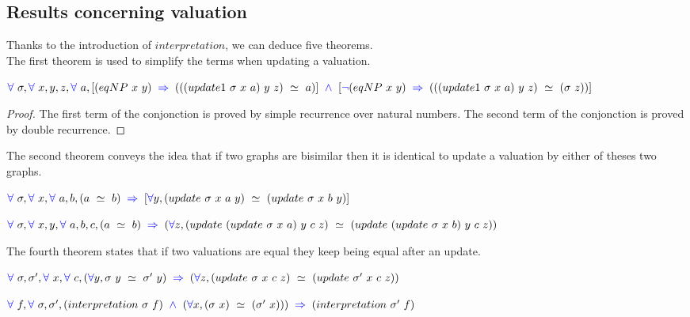 \documentclass[a4paper]{article}
\begin{document}
\subsection{Results concerning valuation}

Thanks to the introduction of $interpretation$, we can deduce five theorems. \\

The first theorem is used to simplify the terms when updating a valuation.

\begin{theorem}
$\fa \ \sigma, \fa \ x, y, z, \fa \ a, [(eqNP \ x \ y) \ \imp \ (((update1 \ \sigma \ x \ a) \ y \ z) \ \simeq \ a)] \ \conj \ [\blneg(eqNP \ x \ y) \ \imp \ (((update1 \ \sigma \ x \ a) \ y \ z) \ \simeq \ (\sigma \ z))]$
\end{theorem}

\begin{proof}
The first term of the conjonction is proved by simple recurrence over natural numbers. The second term of the conjonction is proved by double recurrence.
\end{proof}

The second theorem conveys the idea that if two graphs are bisimilar then it is identical to update a valuation by either of theses two graphs.

\begin{theorem}
$\fa \ \sigma, \fa \ x, \fa \ a, b, (a \ \simeq \ b) \ \imp \ [\fa y, (update \ \sigma \ x \ a \ y) \ \simeq \ (update \ \sigma \ x \ b \ y)]$
\end{theorem}

\begin{theorem}
$\fa \ \sigma, \fa \ x, y, \fa \ a, b, c, (a \ \simeq \ b) \ \imp \ (\fa z, (update \ (update \ \sigma \ x \ a) \ y \ c \ z) \ \simeq \ (update \  (update \ \sigma \ x \ b) \ y \ c \ z))$
\end{theorem}

The fourth theorem states that if two valuations are equal they keep being equal after an update.

\begin{theorem}
$\fa \ \sigma, \sigma', \fa \ x, \fa \ c, (\fa y, \sigma \ y \ \simeq \ \sigma' \ y) \ \imp \ (\fa z, (update \ \sigma \ x \ c \ z) \ \simeq \ (update \ \sigma' \ x \ c \ z))$
\end{theorem}

\begin{theorem}
$\fa \ f, \fa \ \sigma, \sigma', (interpretation \ \sigma \ f) \ \conj \ (\fa x, (\sigma \ x) \ \simeq \ (\sigma' \ x))) \ \imp \ (interpretation \ \sigma' \ f)$
\end{theorem}
\end{document}
